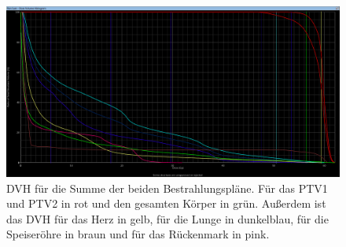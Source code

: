 \begin{figure}[H]
	\centering
	\includegraphics[width=\linewidth]{Bilder/Lunge_DVHsum}
	\caption{DVH für die Summe der beiden Bestrahlungspläne. Für das PTV1 und PTV2 in rot und den gesamten Körper in grün. Außerdem ist das DVH für das Herz in gelb, für die Lunge in dunkelblau, für die Speiseröhre in braun und für das Rückenmark in pink.}
	\label{fig:lungedvhsum}
\end{figure}
